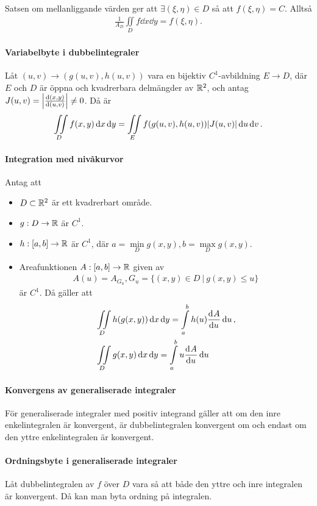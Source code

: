 \proof
Satsen om mellanliggande värden ger att $\exists (\xi, \eta)\in D$ så att $f(\xi, \eta) = C$. Alltså
\begin{align*}
	\frac{1}{A_{D}}\iint\limits_{D}f\dd{x}\dd{y} = f(\xi, \eta).
\end{align*}

\paragraph{Variabelbyte i dubbelintegraler}
Låt $(u, v)\to (g(u, v), h(u, v))$ vara en bijektiv $C^1$-avbildning $E\to D$, där $E$ och $D$ är öppna och kvadrerbara delmängder av $\mathbb{R}^2$, och antag $J(u,v) = \abs{\dv{(x, y)}{(u, v)}}\neq 0$. Då är
\begin{align*}
	\iint\limits_{D}f(x, y)\dd{x}\dd{y} = \iint\limits_{E}f(g(u, v), h(u, v))\abs{J(u, v)}\dd{u}\dd{v}.
\end{align*}

\proof

\paragraph{Integration med nivåkurvor}
Antag att
\begin{itemize}
	\item $D\subset\mathbb{R}^2$ är ett kvadrerbart område.
	\item $g: D\to\mathbb{R}$ är $C^1$.
	\item $h :[a, b]\to\mathbb{R}$ är $C^1$, där $a = \min\limits_{D}{g(x, y)}, b = \max\limits_{D}{g(x, y)}$.
	\item Areafunktionen $A: [a, b]\to\mathbb{R}$ given av
	\begin{align*}
		A(u) = A_{G_u}, G_u = \{(x,y)\in D\ |\ g(x, y)\leq u\}
	\end{align*}
	är $C^1$. Då gäller att
	\begin{align*}
		&\iint\limits_{D}h(g(x, y))\dd{x}\dd{y} = \int\limits_{a}^{b}h(u)\dv[]{A}{u} (u)\dd{u}, \\
		&\iint\limits_{D}g(x, y)\dd{x}\dd{y} = \int\limits_{a}^{b}u\dv[]{A}{u} (u)\dd{u}
	\end{align*}
\end{itemize}

\paragraph{Konvergens av generaliserade integraler}
För generaliserade integraler med positiv integrand gäller att om den inre enkelintegralen är konvergent, är dubbelintegralen konvergent om och endast om den yttre enkelintegralen är konvergent.

\proof

\paragraph{Ordningsbyte i generaliserade integraler}
Låt dubbelintegralen av $f$ över $D$ vara så att både den yttre och inre integralen är konvergent. Då kan man byta ordning på integralen.

\proof